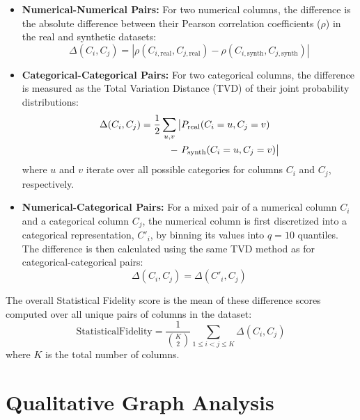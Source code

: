 \begin{itemize}[leftmargin=*]
    \item {\textbf{Numerical-Numerical Pairs:} For two numerical columns, the difference is the absolute difference between their Pearson correlation coefficients ($\rho$) in the real and synthetic datasets:
\begin{equation}
    \Delta(C_i, C_j) = |\rho(C_{i, \text{real}}, C_{j, \text{real}}) - \rho(C_{i, \text{synth}}, C_{j, \text{synth}})|
\end{equation}
}
    \item {\textbf{Categorical-Categorical Pairs:} For two categorical columns, the difference is measured as the Total Variation Distance (TVD) of their joint probability distributions:
\begin{align}
    \Delta(C_i, C_j) = \frac{1}{2} \sum_{u,v} \big| 
    & P_{\text{real}}(C_i=u, C_j=v) \notag \\
    -\ & P_{\text{synth}}(C_i=u, C_j=v) \big|
\end{align}
where $u$ and $v$ iterate over all possible categories for columns $C_i$ and $C_j$, respectively.}
    \item {\textbf{Numerical-Categorical Pairs:} For a mixed pair of a numerical column $C_i$ and a categorical column $C_j$, the numerical column is first discretized into a categorical representation, $C'_i$, by binning its values into $q=10$ quantiles. The difference is then calculated using the same TVD method as for categorical-categorical pairs:
\begin{equation}
    \Delta(C_i, C_j) = \Delta(C'_i, C_j)
\end{equation}}
\end{itemize}

The overall Statistical Fidelity score is the mean of these difference scores computed over all unique pairs of columns in the dataset:
\begin{equation}
    \text{StatisticalFidelity} = \frac{1}{\binom{K}{2}} \sum_{1 \le i < j \le K} \Delta(C_i, C_j)
\end{equation}
where $K$ is the total number of columns.

\section{Qualitative Graph Analysis}
\label{app:qualitative_graph_analysis}

